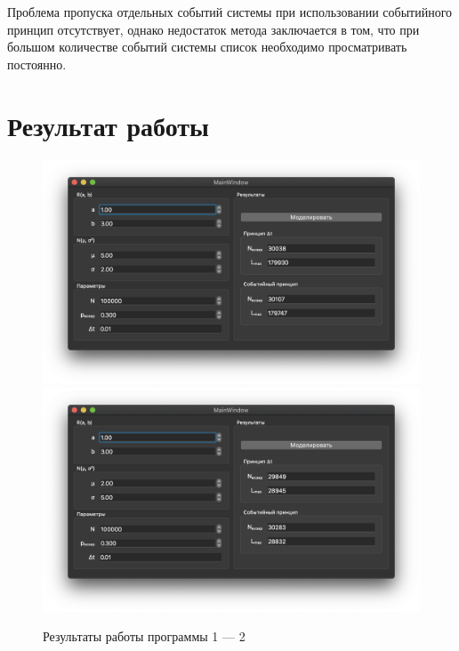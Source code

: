 \documentclass[a4paper,oneside,12pt]{extreport}
\begin{document}
Проблема пропуска отдельных событий системы при использовании событийного принцип отсутствует, однако недостаток метода заключается в том, что при большом количестве событий системы список необходимо просматривать постоянно.

\chapter{Результат работы}

\begin{figure}[H]
	\centering
	\includegraphics[width=\linewidth]{inc/img/result1.png}
	\includegraphics[width=\linewidth]{inc/img/result2.png}
	\caption{Результаты работы программы 1 — 2}
	\label{img:results-12}
\end{figure}
\end{document}
